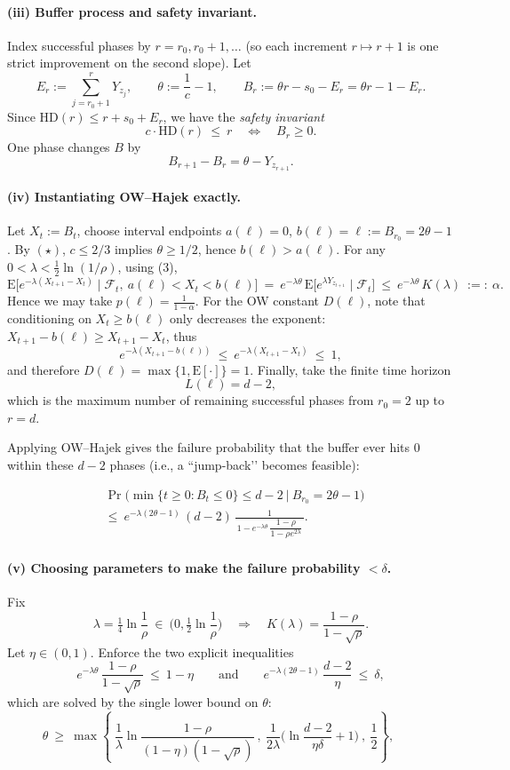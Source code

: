\documentclass[lettersize,journal]{IEEEtran}
\newcommand{\EE}{\text{E}}
\begin{document}
\paragraph{(iii) Buffer process and safety invariant.}
Index successful phases by \(r=r_0,r_0+1,\dots\) (so each increment \(r\mapsto r+1\) is one strict improvement on the second slope). Let
\[
E_r:=\sum_{j=r_0+1}^{r} Y_{z_j},\qquad
\theta:=\frac{1}{c}-1,\qquad
B_r:=\theta r - s_0 - E_r=\theta r - 1 - E_r.
\]
Since \(\mathrm{HD}(r)\le r+s_0+E_r\), we have the \emph{safety invariant}
\[
c\cdot \mathrm{HD}(r)\ \le\ r\quad\Longleftrightarrow\quad B_r\ge 0.
\]
One phase changes \(B\) by
\[
B_{r+1}-B_r=\theta-Y_{z_{r+1}}.
\]

\paragraph{(iv) Instantiating OW–Hajek exactly.}
Let \(X_t:=B_t\), choose interval endpoints \(a(\ell)=0\), \(b(\ell)=\ell:=B_{r_0}=2\theta-1\).
By \((\star)\), \(c\le 2/3\) implies \(\theta\ge 1/2\), hence \(b(\ell)>a(\ell)\).
For any \(0<\lambda<\tfrac12\ln(1/\rho)\), using (3),
\[
\EE\!\big[e^{-\lambda(X_{t+1}-X_t)}\mid \mathcal F_t,\ a(\ell)<X_t<b(\ell)\big]
\ =\ e^{-\lambda\theta}\,\EE\!\big[e^{\lambda Y_{z_{t+1}}}\mid \mathcal F_t\big]
\ \le\ e^{-\lambda\theta}\,K(\lambda)\ :=:\ \alpha.
\]
Hence we may take \(p(\ell)=\frac{1}{1-\alpha}\).
For the OW constant \(D(\ell)\), note that conditioning on \(X_t\ge b(\ell)\) only decreases the exponent:
\(X_{t+1}-b(\ell)\ge X_{t+1}-X_t\), thus
\[
e^{-\lambda(X_{t+1}-b(\ell))}\ \le\ e^{-\lambda(X_{t+1}-X_t)}\ \le\ 1,
\]
and therefore \(D(\ell)=\max\{1,\EE[\cdot]\}=1\).
Finally, take the finite time horizon
\[
L(\ell)=d-2,
\]
which is the maximum number of remaining successful phases from \(r_0=2\) up to \(r=d\).

Applying OW–Hajek gives the failure probability that the buffer ever hits \(0\) within these \(d-2\) phases (i.e., a “jump-back’’ becomes feasible):


\begin{align*}
	&\Pr\!\Big(\min\{t\ge 0:B_t\le 0\}\le d-2\ \Big|\ B_{r_0}=2\theta-1\Big)
	\ \\  &\le\ 
	e^{-\lambda(2\theta-1)}\,(d-2)\,\frac{1}{\,1-e^{-\lambda\theta}\,\dfrac{1-\rho}{1-\rho e^{2\lambda}}\,}.
		\tag{4}
\end{align*}
	

\paragraph{(v) Choosing parameters to make the failure probability \(<\delta\).}
Fix
\[
\lambda=\tfrac14\ln\frac{1}{\rho}\ \in \ \Big(0,\tfrac12\ln\frac{1}{\rho}\Big)
\quad\Longrightarrow\quad
K(\lambda)=\frac{1-\rho}{1-\sqrt{\rho}}.
\]
Let \(\eta\in(0,1)\). Enforce the two explicit inequalities
\[
e^{-\lambda\theta}\,\frac{1-\rho}{1-\sqrt{\rho}}\ \le\ 1-\eta
\qquad\text{and}\qquad
e^{-\lambda(2\theta-1)}\,\frac{d-2}{\eta}\ \le\ \delta,
\]
which are solved by the single lower bound on \(\theta\):
\[
\theta\ \ge\ \max\!\left\{
\ \frac{1}{\lambda}\ln\!\frac{1-\rho}{(1-\eta)(1-\sqrt{\rho})}\ ,\
\frac{1}{2\lambda}\Big(\ln\!\frac{d-2}{\eta\delta}+1\Big)\ ,\
\frac12
\right\},
\qquad
\tag{5}
\]
\end{document}
